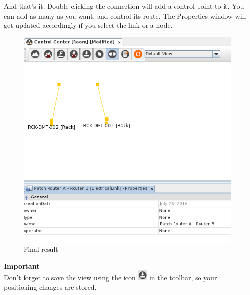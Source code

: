 \documentclass[a4paper]{article}
\begin{document}
			And that's it. Double-clicking the connection will add a control point to it. You can add as many as you want, and control its route. The Properties window will get updated accordingly if you select the link or a node.
			\begin{figure}[h!]
				\centering
				\includegraphics[width=0.6\linewidth]{img/l1_example_1_final.png}
				\caption{Final result}
				\label{fig:l1_example_1_final}
			\end{figure}
			\begin{framed} {\large \textbf{Important}}\\
				Don't forget to save the view using the icon \includegraphics[width=0.5cm]{img/icon_save.png} in the toolbar, so your positioning changes are stored.
			\end{framed}
			
\end{document}

